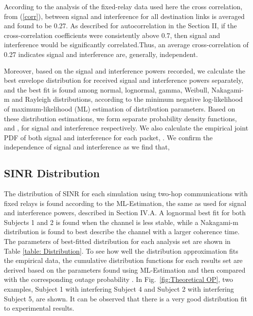 \documentclass[12pt,draftcls,a4paper,onecolumn,journal]{IEEEtran}
\begin{document}
 

According to the analysis of the fixed-relay data used here the cross correlation,  from (\ref{corr}), between signal and interference for all destination links is averaged and found to be 0.27. As described for autocorrelation in the Section II, if the cross-correlation coefficients were consistently above 0.7, then signal and interference would be significantly correlated.Thus, an average cross-correlation of 0.27 indicates signal and interference are, generally, independent.


Moreover, based on the signal and interference powers recorded, we calculate the best envelope distribution for received signal and interference powers separately, and the best fit is found among normal, lognormal, gamma, Weibull, Nakagami-m and Rayleigh distributions, according to the minimum negative log-likelihood of maximum-likelihood (ML) estimation of distribution parameters. Based on these distribution estimations, we form separate probability density functions,  and , for signal and interference respectively. We also calculate the empirical joint PDF of both signal and interference for each packet, . We confirm the independence of signal and interference as we find that,



\subsection{SINR Distribution}
The distribution of SINR for each simulation using two-hop communications with fixed relays is found according to the ML-Estimation, the same as used for signal and interference powers, described in Section IV.A.  A lognormal best fit for both Subjects 1 and 2 is found when the channel is less stable, while a Nakagami-m distribution is found to best describe the channel with a larger coherence time.  The parameters of best-fitted distribution for each analysis set are shown in Table \ref{table: Distribution}. To see how well the distribution approximation fits the empirical data, the cumulative distribution functions for each results set are derived based on the parameters found using ML-Estimation and then compared with the corresponding outage probability . In Fig.~\ref{fig:Theoretical OP}, two examples, Subject 1 with  interfering Subject 4 and Subject 2 with interfering Subject 5, are shown. It can be observed that  there is a very good distribution fit to experimental results.
\end{document}
